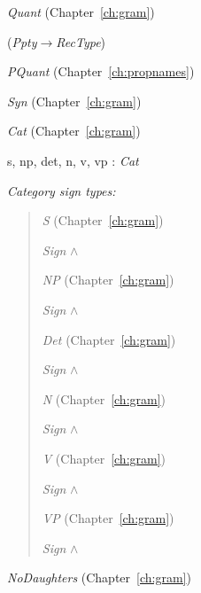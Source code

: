 \textit{Quant} (Chapter~\ref{ch:gram})

(\textit{Ppty}$\rightarrow$\textit{RecType})

\textit{PQuant} (Chapter~\ref{ch:propnames})



\textit{Syn} (Chapter~\ref{ch:gram})


\textit{Cat} (Chapter~\ref{ch:gram})

s, np, det, n, v, vp : \textit{Cat}

\textit{Category sign types:}

\begin{quote}
\textit{S} (Chapter~\ref{ch:gram})

\textit{Sign} \d{$\wedge$}

\textit{NP} (Chapter~\ref{ch:gram})

\textit{Sign} \d{$\wedge$}

\textit{Det} (Chapter~\ref{ch:gram})

\textit{Sign} \d{$\wedge$}

\textit{N} (Chapter~\ref{ch:gram})

\textit{Sign} \d{$\wedge$}

\textit{V} (Chapter~\ref{ch:gram})

\textit{Sign} \d{$\wedge$}

\textit{VP} (Chapter~\ref{ch:gram})

\textit{Sign} \d{$\wedge$}

\end{quote}

\textit{NoDaughters} (Chapter~\ref{ch:gram})

